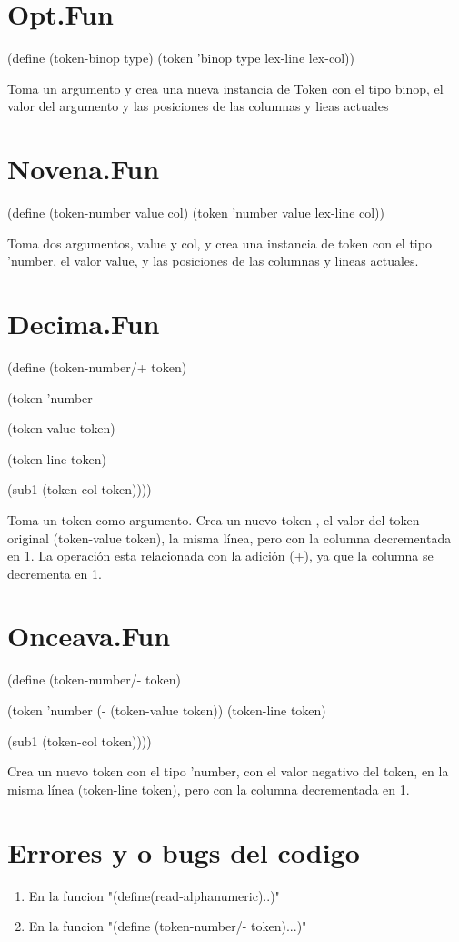 \documentclass[letterpaper,12pt]{article}
\begin{document}
\section* {Opt.Fun}
(define (token-binop type)
  (token 'binop type lex-line lex-col))\par
Toma un argumento y crea una nueva instancia de Token con el tipo binop, el valor del argumento y las posiciones de las columnas y lieas actuales\par

\section* {Novena.Fun}
(define (token-number value col)
  (token 'number value lex-line col))\par

Toma dos argumentos, value y col, y crea una instancia de token con el tipo 'number, el valor value, y las posiciones de las columnas y lineas actuales.\par

 \section* {Decima.Fun}
(define (token-number/+ token)\par
  (token 'number\par
         (token-value token)\par
         (token-line token)\par
         (sub1 (token-col token))))\par

Toma un token como argumento.
Crea un nuevo token , el valor del token original (token-value token), la misma línea, pero con la columna decrementada en 1.
La operación  esta relacionada con la adición (+), ya que la columna se decrementa en 1.
\section* {Onceava.Fun}
(define (token-number/- token)\par
  (token 'number
         (- (token-value token))
         (token-line token)\par
         (sub1 (token-col token))))\par

Crea un nuevo token con el tipo 'number, con el valor negativo del token, en la misma línea (token-line token), pero con la columna decrementada en 1.

\section {Errores y o bugs del codigo}

\begin{enumerate}
\item En la funcion "(define(read-alphanumeric)..)"
\item En la funcion "(define (token-number/- token)...)"
\end{enumerate}
\end{document}
